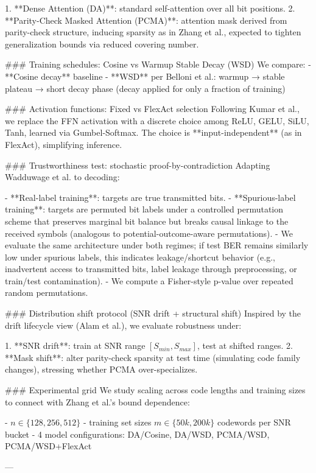 1. **Dense Attention (DA)**: standard self-attention over all bit positions.  
2. **Parity-Check Masked Attention (PCMA)**: attention mask derived from parity-check structure, inducing sparsity as in Zhang et al., expected to tighten generalization bounds via reduced covering number.

### Training schedules: Cosine vs Warmup Stable Decay (WSD)  
We compare:
- **Cosine decay** baseline  
- **WSD** per Belloni et al.: warmup → stable plateau → short decay phase (decay applied for only a fraction of training)

### Activation functions: Fixed vs FlexAct selection  
Following Kumar et al., we replace the FFN activation with a discrete choice among {ReLU, GELU, SiLU, Tanh}, learned via Gumbel-Softmax. The choice is **input-independent** (as in FlexAct), simplifying inference.

### Trustworthiness test: stochastic proof-by-contradiction  
Adapting Wadduwage et al. to decoding:

- **Real-label training**: targets are true transmitted bits.  
- **Spurious-label training**: targets are permuted bit labels under a controlled permutation scheme that preserves marginal bit balance but breaks causal linkage to the received symbols (analogous to potential-outcome-aware permutations).  
- We evaluate the same architecture under both regimes; if test BER remains similarly low under spurious labels, this indicates leakage/shortcut behavior (e.g., inadvertent access to transmitted bits, label leakage through preprocessing, or train/test contamination).  
- We compute a Fisher-style p-value over repeated random permutations.

### Distribution shift protocol (SNR drift + structural shift)  
Inspired by the drift lifecycle view (Alam et al.), we evaluate robustness under:

1. **SNR drift**: train at SNR range \([S_{min}, S_{max}]\), test at shifted ranges.  
2. **Mask shift**: alter parity-check sparsity at test time (simulating code family changes), stressing whether PCMA over-specializes.

### Experimental grid  
We study scaling across code lengths and training sizes to connect with Zhang et al.’s bound dependence:

- \(n \in \{128, 256, 512\}\)  
- training set sizes \(m \in \{50k, 200k\}\) codewords per SNR bucket  
- 4 model configurations: DA/Cosine, DA/WSD, PCMA/WSD, PCMA/WSD+FlexAct

---

